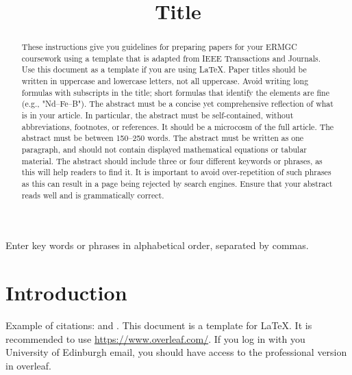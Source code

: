 \documentclass[conference]{IEEEtran}
\begin{document}
\title{Title}

\author{
}

\maketitle

\begin{abstract}

These instructions give you guidelines for preparing papers for your ERMGC coursework using a template that is adapted from IEEE Transactions and Journals. Use this document as a template if you are using \LaTeX. Paper titles should be written in uppercase and lowercase letters, not all uppercase. Avoid writing long formulas with subscripts in the title; short formulas that identify the elements are fine (e.g., "Nd–Fe–B"). The abstract must be a concise yet comprehensive reflection of what is in your article. In particular, the abstract must be self-contained, without abbreviations, footnotes, or references. It should be a microcosm of the full article. The abstract must be between 150–250 words. The abstract must be written as one paragraph, and should not contain displayed mathematical equations or tabular material. The abstract should include three or four different keywords or phrases, as this will help readers to find it. It is important to avoid over-repetition of such phrases as this can result in a page being rejected by search engines. Ensure that your abstract reads well and is grammatically correct.\\
\end{abstract}

\begin{IEEEkeywords}
Enter key words or phrases in alphabetical order, separated by commas. 
\end{IEEEkeywords}


\section{Introduction}

Example of citations: \cite{Chen1993Linear} and \cite{farrar2007introduction, movsessian2021artificial}. This document is a template for \LaTeX. It is recommended to use \url{https://www.overleaf.com/}. If you log in with you University of Edinburgh email, you should have access to the professional version in overleaf.
\end{document}
